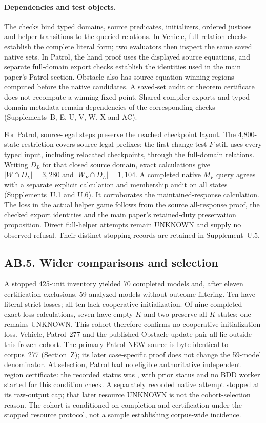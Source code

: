 \paragraph{Dependencies and test objects.}
The checks bind typed domains, source predicates, initializers, ordered
justices and helper transitions to the queried relations. In Vehicle,
full relation checks establish the complete literal form; two evaluators
then inspect the same saved native sets. In Patrol, the hand proof uses
the displayed source equations, and separate full-domain export checks
establish the identities used in the main paper's Patrol section.
Obstacle also has source-equation winning regions computed before the
native candidates. A saved-set audit or theorem certificate does not
recompute a winning fixed point. Shared compiler exports and typed-domain
metadata remain dependencies of the corresponding checks
(Supplements~B, E, U, V, W, X and AC).

For Patrol, source-legal steps preserve the reached checkpoint layout.
The 4,800-state restriction covers source-legal prefixes; the first-change
test $F$ still uses every typed input, including relocated checkpoints,
through the full-domain relations. Writing $D_L$ for that closed source domain, exact calculations give
$|W\cap D_L|=3,280$ and $|W_F\cap D_L|=1,104$. A completed native $M_F$ query agrees with
a separate explicit calculation and membership audit on all states
(Supplements~U.1 and U.6). It corroborates the maintained-response
calculation. The loss in the actual helper game follows from the source
all-response proof, the checked export identities and
the main paper's retained-duty preservation proposition. Direct full-helper attempts remain UNKNOWN
and supply no observed refusal. Their distinct stopping records are
retained in Supplement~U.5.


\subsection*{AB.5. Wider comparisons and selection}

A stopped 425-unit inventory yielded 70 completed models and,
after eleven certification exclusions, 59 analyzed models without
outcome filtering. Ten have literal strict losses; all ten lack
cooperative initialization. Of nine completed exact-loss calculations,
seven have empty $K$ and two preserve all $K$ states; one remains UNKNOWN.
This cohort therefore confirms no cooperative-initialization loss.
Vehicle, Patrol~277 and the published Obstacle update pair all lie outside
this frozen cohort. The primary Patrol NEW source is byte-identical to
corpus~277 (Section~Z); its later case-specific proof does not change the
59-model denominator. At selection, Patrol had no eligible authoritative
independent region certificate: the recorded status was
, with prior status
 and no BDD worker started for this
condition check. A separately recorded native attempt stopped at its raw-output
cap; that later resource UNKNOWN is not the cohort-selection reason.
The cohort is conditioned on completion and certification under the stopped
resource protocol, not a sample establishing corpus-wide incidence.

